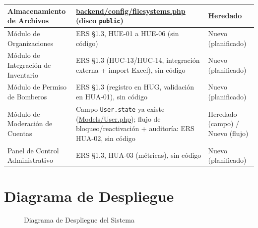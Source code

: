 \begin{longtable}{|L{6cm}|L{6.5cm}|M{2cm}|}
Almacenamiento de Archivos & \url{backend/config/filesystems.php} (disco \texttt{public}) & Heredado \\ \hline
Módulo de Organizaciones & ERS \S1.3, HUE-01 a HUE-06 (sin código) & Nuevo (planificado) \\ \hline
Módulo de Integración de Inventario & ERS \S1.3 (HUC-13/HUC-14, integración externa + import Excel), sin código & Nuevo (planificado) \\ \hline
Módulo de Permiso de Bomberos & ERS \S1.3 (registro en HUG, validación en HUA-01), sin código & Nuevo (planificado) \\ \hline
Módulo de Moderación de Cuentas & Campo \texttt{User.state} ya existe (\url{Models/User.php}); flujo de bloqueo/reactivación + auditoría: ERS HUA-02, sin código & Heredado (campo) / Nuevo (flujo) \\ \hline
Panel de Control Administrativo & ERS \S1.3, HUA-03 (métricas), sin código & Nuevo (planificado) \\ \hline
\end{longtable}
\clearpage

\section{Diagrama de Despliegue}

\begin{figure}[H]
    \centering
    \caption{Diagrama de Despliegue del Sistema}
    \label{fig:despliegue}
\end{figure}


